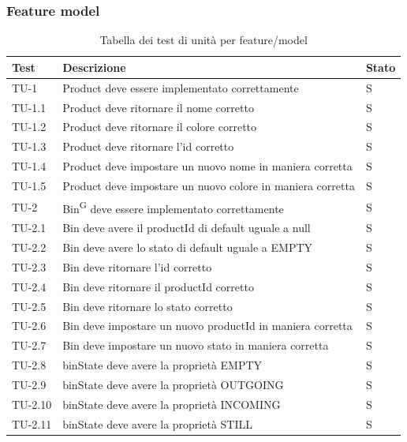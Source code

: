 \subsubsection{Feature model}
\renewcommand{\arraystretch}{1.5}
\begin{xltabular}{0.9\textwidth}{X | p{0.6\textwidth} | p{0.1\textwidth} }
    \textbf{\color{white} Test} & \textbf{\color{white} Descrizione} & \textbf{\color{white} Stato}\\ 
    \hline
    \endhead
    \caption{Tabella dei test di unità per feature/model} 
    \label{tab:test_sistema}
    \endlastfoot
    TU-1 & Product deve essere implementato correttamente & S\\
    TU-1.1 & Product deve ritornare il nome corretto & S\\
    TU-1.2 & Product deve ritornare il colore corretto & S\\
    TU-1.3 & Product deve ritornare l'id corretto & S\\
    TU-1.4 & Product deve impostare un nuovo nome in maniera corretta & S\\
    TU-1.5 & Product deve impostare un nuovo colore in maniera corretta & S\\

    TU-2 & Bin\textsuperscript{G} deve essere implementato correttamente & S\\
    TU-2.1 & Bin deve avere il productId di default uguale a null & S\\
    TU-2.2 & Bin deve avere lo stato di default uguale a EMPTY & S\\
    TU-2.3 & Bin deve ritornare l'id corretto & S\\
    TU-2.4 & Bin deve ritornare il productId corretto & S\\
    TU-2.5 & Bin deve ritornare lo stato corretto & S\\
    TU-2.6 & Bin deve impostare un nuovo productId in maniera corretta & S\\
    TU-2.7 & Bin deve impostare un nuovo stato in maniera corretta & S\\
    TU-2.8 & binState deve avere la proprietà EMPTY & S\\
    TU-2.9 & binState deve avere la proprietà OUTGOING & S\\
    TU-2.10 & binState deve avere la proprietà INCOMING & S\\
    TU-2.11 & binState deve avere la proprietà STILL & S\\
    

\end{xltabular}
